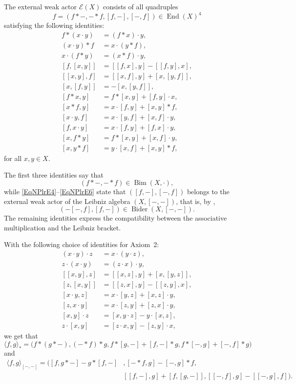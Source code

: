 \documentclass[reqno,a4paper]{amsart}
\theoremstyle{plain}
\theoremstyle{definition}
\theoremstyle{remark}
\numberwithin{equation}{section}
\newcommand{\E}{\mathcal{E}}
\DeclareMathOperator{\Bim}{Bim}
\DeclareMathOperator{\End}{End}
\DeclareMathOperator{\Bider}{Bider}
\begin{document}
The external weak actor $\E(X)$ consists of all quadruples
\[
f=(f\ast-,-\ast f,[f,-],[-,f])\in\End(X)^4
\]
satisfying the following identities:
\begin{align}
f\ast(x\cdot y)&=(f\ast x)\cdot y, \label{EqNPlrE1}\\
(x\cdot y)\ast f&=x\cdot(y\ast f), \label{EqNPlrE2}\\
x\cdot(f\ast y)&=(x\ast f)\cdot y, \label{EqNPlrE3}\\
[f,[x,y]]&=[[f,x],y]-[[f,y],x], \label{EqNPlrE4}\\
[[x,y],f]&=[[x,f],y]+[x,[y,f]], \label{EqNPlrE5}\\
[x,[f,y]]&=-[x,[y,f]], \label{EqNPlrE6}\\
[f\ast x,y]&=f\ast[x,y]+[f,y]\cdot x, \label{EqNPlrE7}\\
[x\ast f,y]&=x\cdot[f,y]+[x,y]\ast f, \label{EqNPlrE8}\\
[x\cdot y,f]&=x\cdot[y,f]+[x,f]\cdot y, \label{EqNPlrE9}\\
[f,x\cdot y]&=x\cdot[f,y]+[f,x]\cdot y, \label{EqNPlrE10}\\
[x,f\ast y]&=f\ast[x,y]+[x,f]\cdot y, \label{EqNPlrE11}\\
[x,y\ast f]&=y\cdot[x,f]+[x,y]\ast f, \label{EqNPlrE12}
\end{align}
for all $x,y\in X$.

The first three identities say that
\[
(f\ast-,-\ast f)\in\Bim(X,\cdot),
\]
while \eqref{EqNPlrE4}--\eqref{EqNPlrE6} state that $([f,-],[-,f])$ belongs to the external weak actor of the Leibniz algebra $(X,[-,-])$, that is, by ,
\[
(-[-,f],[f,-]) \in \Bider(X,[-,-]).
\]
The remaining identities express the compatibility between the associative multiplication and the Leibniz bracket.

With the following choice of identities for Axiom~2:
\begin{align}
(x\cdot y)\cdot z&=x\cdot(y\cdot z), \label{EqNPlrAxiom1}\\
z\cdot(x\cdot y)&=(z\cdot x)\cdot y, \label{EqNPlrAxiom2}\\
[[x,y],z]&=[[x,z],y]+[x,[y,z]], \label{EqNPlrAxiom7}\\
[z,[x,y]]&=[[z,x],y]-[[z,y],x], \label{EqNPlrAxiom8}\\
[x\cdot y,z]&=x\cdot[y,z]+[x,z]\cdot y, \label{EqNPlrAxiom3}\\
[z,x\cdot y]&=x\cdot[z,y]+[z,x]\cdot y, \label{EqNPlrAxiom4}\\
[x,y]\cdot z&=[x,y\cdot z]-y\cdot[x,z], \label{EqNPlrAxiom5}\\
z\cdot[x,y]&=[z\cdot x,y]-[z,y]\cdot x, \label{EqNPlrAxiom6}
\end{align}
we get that
\[
\langle f,g\rangle_\ast=
\bigl(
f\ast(g\ast-),
(-\ast f)\ast g,
f\ast[g,-]+[f,-]\ast g,
f\ast[-,g]+[-,f]\ast g
\bigr)
\]
and
\begin{align*}
\langle f,g\rangle_{[-,-]}=
\bigl(
[f,g\ast-]-g\ast[f,-]&,[-\ast f,g]-[-,g]\ast f,\\
&[[f,-],g]+[f,[g,-]],
[[-,f],g]-[[-,g],f]
\bigr).
\end{align*}
\end{document}
